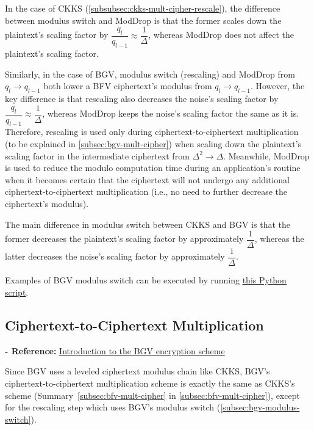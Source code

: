 In the case of CKKS (\autoref{subsubsec:ckks-mult-cipher-rescale}), the difference between modulus switch and \textsf{ModDrop} is that the former scales down the plaintext's scaling factor by $\dfrac{q_l}{q_{l-1}} \approx \dfrac{1}{\Delta}$, whereas \textsf{ModDrop} does not affect the plaintext's scaling factor. 

Similarly, in the case of BGV, modulus switch (rescaling) and \textsf{ModDrop} from $q_l \rightarrow q_{l-1}$ both lower a BFV ciphertext's modulus from $q_l \rightarrow q_{l-1}$. However, the key difference is that rescaling also decreases the noise's scaling factor by $\dfrac{q_l}{q_{l-1}} \approx \dfrac{1}{\Delta}$, whereas \textsf{ModDrop} keeps the noise's scaling factor the same as it is. Therefore, rescaling is used only during ciphertext-to-ciphertext multiplication (to be explained in \autoref{subsec:bgv-mult-cipher}) when scaling down the plaintext's scaling factor in the intermediate ciphertext from $\Delta^2 \rightarrow \Delta$. Meanwhile, \textsf{ModDrop} is used to reduce the modulo computation time during an application's routine when it becomes certain that the ciphertext will not undergo any additional ciphertext-to-ciphertext multiplication (i.e., no need to further decrease the ciphertext's modulus). 

The main difference in modulus switch between CKKS and BGV is that the former decreases the plaintext's scaling factor by approximately $\dfrac{1}{\Delta}$, whereas the latter decreases the noise's scaling factor by approximately $\dfrac{1}{\Delta}$. 

 Examples of BGV modulus switch can be executed by running \href{https://github.com/gogo9th/fhe-textbook/blob/main/source%20code/bgv.py}{\underline{this Python script}}. 


\subsection{Ciphertext-to-Ciphertext Multiplication}
\label{subsec:bgv-mult-cipher}

\noindent \textbf{- Reference:} 
\href{https://www.inferati.com/blog/fhe-schemes-bgv}{Introduction to the BGV encryption scheme}

Since BGV uses a leveled ciphertext modulus chain like CKKS, BGV's ciphertext-to-ciphertext multiplication scheme is exactly the same as CKKS's scheme (Summary~\ref*{subsec:bfv-mult-cipher} in \autoref{subsec:bfv-mult-cipher}), except for the rescaling step which uses BGV's modulus switch (\autoref{subsec:bgv-modulus-switch}). 

